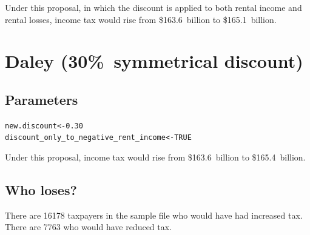 \documentclass{grattan}\usepackage[]{graphicx}\usepackage[]{color}
\makeatletter
\newcommand{\hlnum}[1]{\textcolor[rgb]{0.686,0.059,0.569}{#1}}%
\newcommand{\hlstd}[1]{\textcolor[rgb]{0.345,0.345,0.345}{#1}}%
\newcommand{\hlkwb}[1]{\textcolor[rgb]{0.69,0.353,0.396}{#1}}%
\newenvironment{kframe}{%
 \def\at@end@of@kframe{}%
 \ifinner\ifhmode%
  \def\at@end@of@kframe{\end{minipage}}%
  \begin{minipage}{\columnwidth}%
 \fi\fi%
 \def\FrameCommand##1{\hskip\@totalleftmargin \hskip-\fboxsep
 \colorbox{shadecolor}{##1}\hskip-\fboxsep
     \hskip-\linewidth \hskip-\@totalleftmargin \hskip\columnwidth}%
 \MakeFramed {\advance\hsize-\width
   \@totalleftmargin\z@ \linewidth\hsize
   \@setminipage}}%
 {\par\unskip\endMakeFramed%
 \at@end@of@kframe}
\newenvironment{knitrout}{}{} %
\makeatother
\begin{document}
Under this proposal, in which the discount is applied to both rental income and rental losses, income tax would rise from \$163.6~billion to \$165.1~billion.

\section{Daley (30\%\ symmetrical discount)}
\subsection{Parameters}

\begin{knitrout}
\color{fgcolor}\begin{kframe}
\begin{alltt}
\hlstd{new.discount} \hlkwb{<-} \hlnum{0.30}
\hlstd{discount_only_to_negative_rent_income} \hlkwb{<-} \hlnum{TRUE}
\end{alltt}
\end{kframe}
\end{knitrout}


Under this proposal, income tax would rise from \$163.6~billion to \$165.4~billion.
\onecolumn
\subsection{Who loses?}
There are 16178 taxpayers in the sample file who would have had increased tax. There are 7763 who would have reduced tax.
\end{document}
